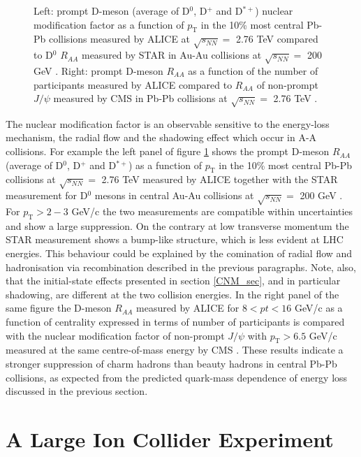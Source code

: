 \documentclass[b5paper,10pt,twoside,oldstyle,classica]{toptesi}
\newcommand{\pt}{p_\text{T}}
\begin{document}
\begin{figure}[tb]
\begin{center}
\caption{Left: prompt D-meson (average of D$^0$, D$^+$ and D$^{*+}$) nuclear modification factor as a function of $\pt$ in the 10\% most central Pb-Pb collisions measured by ALICE at $\sqrt{s_{NN}} = $ 2.76 TeV compared to D$^0$ $R_{AA}$ measured by STAR in Au-Au collisions at $\sqrt{s_{NN}} = $ 200 GeV \cite{Adam:2015sza}. Right: prompt D-meson $R_{AA}$ as a function of the number of participants measured by ALICE compared to $R_{AA}$ of non-prompt $J/\psi$ measured by CMS in Pb-Pb collisions at $\sqrt{s_{NN}} = $ 2.76 TeV \cite{Rossi:2014gma}.}
\label{RPbPb}
\end{center}
\end{figure}
The nuclear modification factor is an observable sensitive to the energy-loss mechanism, the radial flow and the shadowing effect which occur in A-A collisions. For example the left panel of figure \ref{RPbPb} shows the prompt D-meson $R_{AA}$ (average of D$^0$, D$^+$ and D$^{*+}$) as a function of $\pt$ in the 10\% most central Pb-Pb collisions at $\sqrt{s_{NN}} = $ 2.76 TeV measured by ALICE \cite{Adam:2015sza} together with the STAR measurement for D$^0$ mesons in central Au-Au collisions at $\sqrt{s_{NN}} = $ 200 GeV \cite{Adamczyk:2014uip}. For $\pt > 2-3$ GeV/c the two measurements are compatible within uncertainties and show a large suppression. On the contrary at low transverse momentum the STAR measurement shows a bump-like structure, which is less evident at LHC energies. This behaviour could be explained by the comination of radial flow and hadronisation via recombination described in the previous paragraphs. Note, also, that the initial-state effects presented in section \ref{CNM_sec}, and in particular shadowing, are different at the two collision energies. In the right panel of the same figure the D-meson $R_{AA}$ measured by ALICE for $8<pt<16$ GeV/c as a function of centrality expressed in terms of number of participants is compared with the nuclear modification factor of non-prompt $J/\psi$ with $\pt>6.5$ GeV/c measured at the same centre-of-mass energy by CMS \cite{Rossi:2014gma}. These results indicate a stronger suppression of charm hadrons than beauty hadrons in central Pb-Pb collisions, as expected from the predicted quark-mass dependence of energy loss discussed in the previous section.
\chapter{A Large Ion Collider Experiment}
\end{document}
